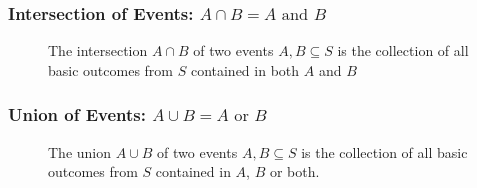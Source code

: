 \documentclass[handout]{beamer}
\begin{document}
\begin{frame}
\frametitle{Intersection of Events: $A\cap B = A \mbox{ and } B$}
\begin{figure}
\centering
{}
\caption{The intersection $A\cap B$ of two events $A,B\subseteq S$ is the collection of all basic outcomes from $S$ contained in both $A$ and $B$}
\end{figure}
\end{frame}
\begin{frame}
\frametitle{Union of Events: $A\cup B = A \mbox{ or } B$}
\begin{figure}
\centering
{}
\caption{The union $A\cup B$ of two events $A,B\subseteq S$ is the collection of all basic outcomes from $S$ contained in $A$, $B$ or both.}
\end{figure}
\end{frame}
\end{document}
